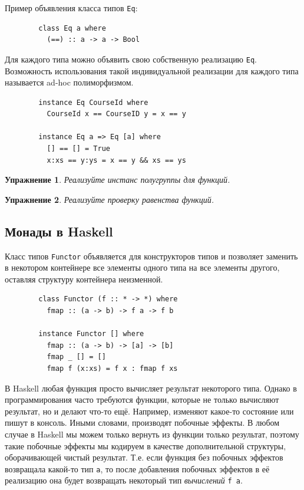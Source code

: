 \documentclass[12pt]{article}
\newcommand{\point}[1]{{\color{blue}\textit{#1}}} %
\newtheorem{task}{Упражнение}
\begin{document}
    Пример объявления класса типов \texttt{Eq}:
    \begin{verbatim}
        class Eq a where
          (==) :: a -> a -> Bool
    \end{verbatim}

    Для каждого типа можно объявить свою собственную реализацию \texttt{Eq}.
    Возможность использования такой индивидуальной реализации для каждого типа называется ad-hoc полиморфизмом.
    \begin{verbatim}
        instance Eq CourseId where
          CourseId x == CourseID y = x == y

        instance Eq a => Eq [a] where
          [] == [] = True
          x:xs == y:ys = x == y && xs == ys
    \end{verbatim}

    \begin{task}
        Реализуйте инстанс полугруппы для функций.
    \end{task}

    \begin{task}
        Реализуйте проверку равенства функций.
    \end{task}

    \subsection{Монады в Haskell}

    Класс типов \texttt{Functor} объявляется для конструкторов типов и позволяет заменить в некотором контейнере все элементы одного типа на все элементы другого, оставляя структуру контейнера неизменной.

    \begin{verbatim}
        class Functor (f :: * -> *) where
          fmap :: (a -> b) -> f a -> f b

        instance Functor [] where
          fmap :: (a -> b) -> [a] -> [b]
          fmap _ [] = []
          fmap f (x:xs) = f x : fmap f xs
    \end{verbatim}

    В Haskell любая функция просто вычисляет результат некоторого типа.
    Однако в программирования часто требуются функции, которые не только вычисляют результат, но и делают что-то ещё.
    Например, изменяют какое-то состояние или пишут в консоль.
    Иными словами, производят побочные эффекты.
    В любом случае в Haskell мы можем только вернуть из функции только результат, поэтому такие побочные эффекты мы кодируем в качестве дополнительной структуры, оборачивающей чистый результат.
    Т.е. если функция без побочных эффектов возвращала какой-то тип \texttt{a}, то после добавления побочных эффектов в её реализацию она будет возвращать некоторый тип \point{вычислений} \texttt{f a}.
\end{document}
